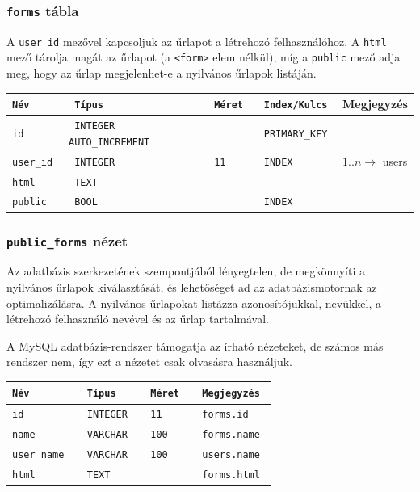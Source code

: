 \documentclass[12pt,a4paper,twoside]{article}
\begin{document}
\subsubsection{\texttt{forms} tábla}

A \texttt{user\_id} mezővel kapcsoljuk az űrlapot a létrehozó felhasználóhoz. A
\texttt{html} mező tárolja magát az űrlapot (a \texttt{<form>} elem nélkül), míg
a \texttt{public} mező adja meg, hogy az űrlap megjelenhet-e a nyilvános űrlapok
listáján.

\small
\vspace{.3cm}
\begin{tabular*}{\textwidth}{>{\tt}l>{\tt}l>{\tt}l>{\tt}l|l}
  \rm Név    & \rm Típus &  \rm Méret  & \rm Index/Kulcs & Megjegyzés\\
  \hline
  id        & INTEGER AUTO\_INCREMENT && PRIMARY\_KEY   &                            \\
  user\_id  & INTEGER   & 11          & INDEX           & $1..n \rightarrow{}$ users \\
  html      & TEXT      &             &                 &                            \\
  public    & BOOL      &             & INDEX           &
\end{tabular*}
\normalsize

\subsubsection{\texttt{public\_forms} nézet}

Az adatbázis szerkezetének szempontjából lényegtelen, de megkönnyíti a nyilvános
űrlapok kiválasztását, és lehetőséget ad az adatbázismotornak az
optimalizálásra. A nyilvános űrlapokat listázza azonosítójukkal, nevükkel, a
létrehozó felhasználó nevével és az űrlap tartalmával.

A MySQL adatbázis-rendszer támogatja az írható nézeteket, de számos más rendszer
nem, így ezt a nézetet csak olvasásra használjuk.

\small
\vspace{.3cm}
\begin{tabular*}{\textwidth}{>{\tt}l>{\tt}l>{\tt}l|>{\tt}l}
  \rm Név     &  \rm Típus    &  \rm Méret  & Megjegyzés \\
  \hline
  id         &  INTEGER      &  11         & forms.id   \\
  name       &  VARCHAR      &  100        & forms.name \\
  user\_name &  VARCHAR      &  100        & users.name \\
  html       &  TEXT         &             & forms.html
\end{tabular*}
\normalsize
\end{document}

